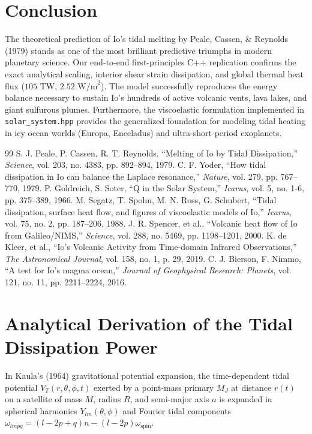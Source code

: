 \documentclass[11pt,a4paper]{article}
\begin{document}
\section{Conclusion}
The theoretical prediction of Io's tidal melting by Peale, Cassen, \& Reynolds (1979) stands as one of the most brilliant predictive triumphs in modern planetary science. Our end-to-end first-principles C++ replication confirms the exact analytical scaling, interior shear strain dissipation, and global thermal heat flux ($105\text{ TW}$, $2.52\text{ W/m}^2$). The model successfully reproduces the energy balance necessary to sustain Io's hundreds of active volcanic vents, lava lakes, and giant sulfurous plumes. Furthermore, the viscoelastic formulation implemented in \texttt{solar\_system.hpp} provides the generalized foundation for modeling tidal heating in icy ocean worlds (Europa, Enceladus) and ultra-short-period exoplanets.

\begin{thebibliography}{99}
 S. J. Peale, P. Cassen, R. T. Reynolds, ``Melting of Io by Tidal Dissipation,'' \textit{Science}, vol. 203, no. 4383, pp. 892--894, 1979.
 C. F. Yoder, ``How tidal dissipation in Io can balance the Laplace resonance,'' \textit{Nature}, vol. 279, pp. 767--770, 1979.
 P. Goldreich, S. Soter, ``Q in the Solar System,'' \textit{Icarus}, vol. 5, no. 1-6, pp. 375--389, 1966.
 M. Segatz, T. Spohn, M. N. Ross, G. Schubert, ``Tidal dissipation, surface heat flow, and figures of viscoelastic models of Io,'' \textit{Icarus}, vol. 75, no. 2, pp. 187--206, 1988.
 J. R. Spencer, et al., ``Volcanic heat flow of Io from Galileo/NIMS,'' \textit{Science}, vol. 288, no. 5469, pp. 1198--1201, 2000.
 K. de Kleer, et al., ``Io's Volcanic Activity from Time-domain Infrared Observations,'' \textit{The Astronomical Journal}, vol. 158, no. 1, p. 29, 2019.
 C. J. Bierson, F. Nimmo, ``A test for Io's magma ocean,'' \textit{Journal of Geophysical Research: Planets}, vol. 121, no. 11, pp. 2211--2224, 2016.
\end{thebibliography}

\appendix
\section{Analytical Derivation of the Tidal Dissipation Power}
In Kaula's (1964) gravitational potential expansion, the time-dependent tidal potential $V_T(r, \theta, \phi, t)$ exerted by a point-mass primary $M_J$ at distance $r(t)$ on a satellite of mass $M$, radius $R$, and semi-major axis $a$ is expanded in spherical harmonics $Y_{lm}(\theta, \phi)$ and Fourier tidal components $\omega_{lmpq} = (l - 2p + q)n - (l - 2p)\omega_{\mathrm{spin}}$.
\end{document}
